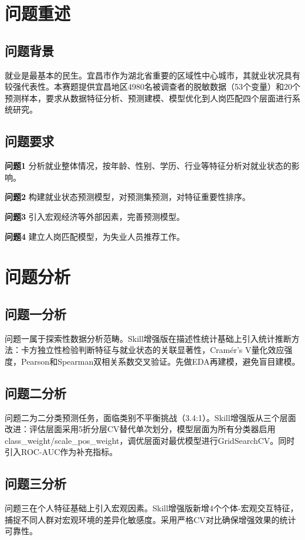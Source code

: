 \documentclass[withoutpreface,bwprint]{cumcmthesis}
\begin{document}
\section{问题重述}
\subsection{问题背景}

就业是最基本的民生。宜昌市作为湖北省重要的区域性中心城市，其就业状况具有较强代表性。本赛题提供宜昌地区4980名被调查者的脱敏数据（53个变量）和20个预测样本，要求从数据特征分析、预测建模、模型优化到人岗匹配四个层面进行系统研究。

\subsection{问题要求}

\textbf{问题1} 分析就业整体情况，按年龄、性别、学历、行业等特征分析对就业状态的影响。

\textbf{问题2} 构建就业状态预测模型，对预测集预测，对特征重要性排序。

\textbf{问题3} 引入宏观经济等外部因素，完善预测模型。

\textbf{问题4} 建立人岗匹配模型，为失业人员推荐工作。

\section{问题分析}
\subsection{问题一分析}
问题一属于探索性数据分析范畴。Skill增强版在描述性统计基础上引入统计推断方法：卡方独立性检验判断特征与就业状态的关联显著性，Cramér's V量化效应强度，Pearson和Spearman双相关系数交叉验证。先做EDA再建模，避免盲目建模。

\subsection{问题二分析}
问题二为二分类预测任务，面临类别不平衡挑战（3.4:1）。Skill增强版从三个层面改进：评估层面采用5折分层CV替代单次划分，模型层面为所有分类器启用class\_weight/scale\_pos\_weight，调优层面对最优模型进行GridSearchCV。同时引入ROC-AUC作为补充指标。

\subsection{问题三分析}
问题三在个人特征基础上引入宏观因素。Skill增强版新增4个个体-宏观交互特征，捕捉不同人群对宏观环境的差异化敏感度。采用严格CV对比确保增强效果的统计可靠性。
\end{document}

